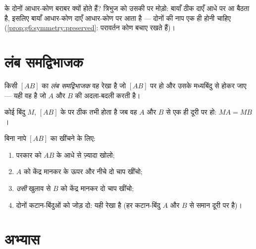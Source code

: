 \begin{example}[सममिति बराबरी सिद्ध कर देती है]\label{ex:g6:symmetry:proves}
 के दोनों आधार-कोण बराबर क्यों होते हैं?
त्रिभुज को उसकी  पर मोड़ो: बायाँ  ठीक दाएँ आधे पर
आ बैठता है, इसलिए बायाँ आधार-कोण दाएँ आधार-कोण पर आता है ---
दोनों की नाप एक ही होनी चाहिए
(\cref{prop:g6:symmetry:preserved}: परावर्तन कोण बचाए रखते हैं)।
\end{example}

\section{लंब समद्विभाजक}

\begin{definition}[लंब समद्विभाजक]\label{def:g6:symmetry:bisector}
किसी  $[AB]$ का \emph{लंब समद्विभाजक}
वह रेखा है जो $[AB]$ पर  हो और उसके मध्यबिंदु से होकर जाए ---
यही वह  है जो $A$ और $B$ की अदला-बदली करती है।
\end{definition}

\begin{proposition}[समदूरी]\label{prop:g6:symmetry:bisector}
कोई बिंदु $M$, $[AB]$ के  पर ठीक तभी होता है जब वह
$A$ और $B$ से एक ही दूरी पर हो: $MA = MB$।
\end{proposition}
\admitted

\begin{method}\label{met:g6:symmetry:bisector}
बिना नापे $[AB]$ का  खींचने के लिए:
\begin{enumerate}
  \item परकार को $AB$ के आधे से ज़्यादा खोलो;
  \item $A$ को केंद्र मानकर  के ऊपर और नीचे दो चाप खींचो;
  \item \emph{उसी} खुलाव से $B$ को केंद्र मानकर दो चाप खींचो;
  \item दोनों कटान-बिंदुओं को जोड़ दो: यही रेखा 
        है (हर कटान-बिंदु $A$ और $B$ से समान दूरी पर है)।
\end{enumerate}
\end{method}

\section{अभ्यास}


